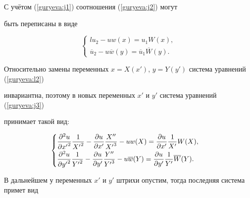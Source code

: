 С учётом (\ref{guryeva:j1}) соотношения (\ref{guryeva:j2}) могут


быть переписаны в виде


\begin{equation} \label{guryeva:j3}


\begin{cases}{l} u_{2}-u w(x)=u_{1}W(x), \\


\overline{u}_{2}-u \overline{w}(y)=\overline{u}_{1}\overline{W}(y).


\end{cases}


\end{equation}





Относительно замены переменных $x=X(x')$, $y=Y(y')$ система уравнений (\ref{guryeva:l2})


инвариантна, поэтому в новых переменных $x'$ и $y'$ система уравнений (\ref{guryeva:j3})


принимает такой вид:


\begin{equation*}


\begin{cases}


\displaystyle\frac{\partial^{2} u}{\partial {x' }^2} \frac{1}{{X' }^2}- \frac{\partial u}{\partial {x' }}


\frac{X''}{{X' }^3 }-uw(X)= \frac{\partial u}{\partial {x' }} \frac{1}{X' }W(X), \vspace{1mm}


\\


\displaystyle\frac{\partial^{2} u}{\partial {y'} ^2} \frac{1}{{Y' }^2}-


\frac{\partial u}{\partial y' } \frac{Y''}{{Y' } ^3}-u\overline{w}(Y)=


\frac{\partial u}{\partial y' } \frac{1}{{Y' }}  \overline{W}(Y).


\end{cases}


\end{equation*}


В дальнейшем у переменных $x'$ и $y'$ штрихи опустим, тогда последняя система примет вид


